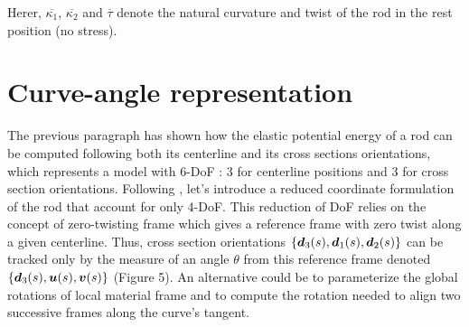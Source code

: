 Herer, $\overbar{\kappa_1}$, $\overbar{\kappa_2}$ and $\overbar{\tau}$  denote the natural curvature and twist of the rod in the rest position (no stress).

\section{Curve-angle representation}
The previous paragraph has shown how the elastic potential energy of a rod can be computed following both its centerline and its cross sections orientations, which represents a model with 6-DoF : 3 for centerline positions and 3 for cross section orientations. Following \cite{Bergou2008}, let’s introduce a reduced coordinate formulation of the rod that account for only 4-DoF. This reduction of DoF relies on the concept of zero-twisting frame which gives a reference frame with zero twist along a given centerline. Thus, cross section orientations $\{\boldsymbol{d}_3 (s),\boldsymbol{d}_1 (s),\boldsymbol{d}_2 (s)\}$ can be tracked only by the measure of an angle $\theta$ from this reference frame denoted $\{\boldsymbol{d}_3(s),\boldsymbol{u}(s),\boldsymbol{v}(s)\}$ (Figure 5). An alternative could be to parameterize the global rotations of local material frame and to compute the rotation needed to align two successive frames along the curve’s tangent.

